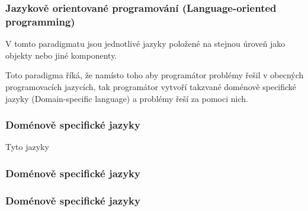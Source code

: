\begin{frame}
    \frametitle{Jazykově orientované programování (Language-oriented programming)}

    V tomto paradigmatu jsou jednotlivé jazyky položené na stejnou úroveň jako objekty nebo jiné komponenty.

    Toto paradigma říká, že namísto toho aby programátor problémy řešil v obecných programovacích jazycích, tak programátor vytvoří takzvané doménově specifické jazyky (Domain-specific language) a problémy řeší za pomoci nich.

\end{frame}


\begin{frame}
    \frametitle{Doménově specifické jazyky}
    Tyto jazyky 


\end{frame}

\begin{frame}
    \frametitle{Doménově specifické jazyky}


\end{frame}


\begin{frame}
    \frametitle{Doménově specifické jazyky}


\end{frame}